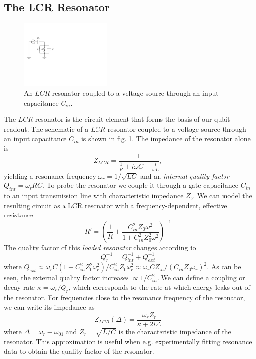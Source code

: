 \subsection{The LCR Resonator}

\begin{figure}
	\centering
	\includegraphics[width=0.4\textwidth]{"./material/figures/introduction/lcr_resonator"}
	\caption[]{An $LCR$ resonator coupled to a voltage source through an input capacitance $C_{in}$.}
	\label{fig:lcr_resonator}
\end{figure}

The $LCR$ resonator is the circuit element that forms the basis of our qubit readout. The schematic of a $LCR$ resonator coupled to a voltage source through an input capacitance $C_{in}$ is  shown in fig. \ref{fig:lcr_resonator}. The impedance of the resonator alone is
%
\begin{equation}
Z_{LCR} = \frac{1}{\frac{1}{R}+i\omega C - \frac{i}{\omega L}},
\end{equation}
%
yielding a resonance frequency $\omega_r = 1/\sqrt{LC}$ and an {\it internal quality factor} $Q_{int} = \omega_r R C$. To probe the resonator we couple it through a gate capacitance $C_{in}$ to an input transmission line with characteristic impedance $Z_0$. We can model the resulting circuit as a LCR resonator with a frequency-dependent, effective resistance
%
\begin{equation}
R' = \left(\frac{1}{R}+\frac{C_{in}^2 Z_0 \omega^2}{1+C_{in}^2 Z_0^2 \omega^2}\right)^{-1}
\end{equation}
%
The quality factor of this {\it loaded resonator} changes according to 
%
\begin{equation}
Q_r^{-1} = Q^{-1}_{int}+Q^{-1}_{ext}
\end{equation}
%
where $Q_{ext} \approx \omega_r C (1+C_{in}^2Z_0^2\omega_r^2)/C_{in}^2 Z_0\omega_r^2 \approx \omega_r C Z_{in}/(C_{in}Z_0 \omega_r)^2$. As can be seen, the external quality factor increases $\propto 1 / C_{in}^2$. We can define a coupling or decay rate $\kappa=\omega_r/Q_r$, which corresponds to the rate at which energy leaks out of the resonator. For frequencies close to the resonance frequency of the resonator, we can write its impedance as
%
\begin{equation}
Z_{LCR}(\Delta) = \frac{\omega_r Z_r}{\kappa+2i\Delta} \label{eq:lcr_lorentzian}
\end{equation}
%
where $\Delta = \omega_r-\omega_{01}$ and $Z_r = \sqrt{L/C}$ is the characteristic impedance of the resonator. This approximation is useful when e.g. experimentally fitting resonance data to obtain the quality factor of the resonator.

